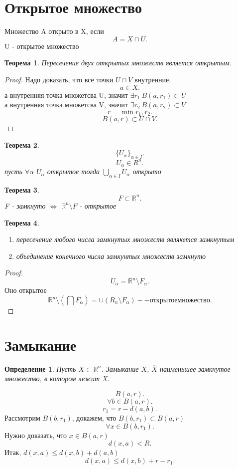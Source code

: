 \documentclass[14pt]{extarticle} \usepackage{fontspec}
\newtheorem{theorem}{Теорема}
\newtheorem{definition}{Определение}
\begin{document}
\section{Открытое множество}
Множество A открыто в  X, если
\[
	A = X \cap U
	.\]
U - открытое множество
\begin{theorem}
	Пересечение двух открытых множеств является открытым.
\end{theorem}
\begin{proof}
	Надо доказать, что все точки $U \cap V$ внутренние.\\
	\[
		a \in X
		.\]
	а внутренняя точка множетсва U, значит  $\exists r_1  ~ B(a,r_1) \subset U$\\
	а внутренняя точка множетсва V, значит  $\exists r_2  ~ B(a,r_2) \subset V$
	\[
		r = \min{r_1,r_2}
		.\]
	\[
		B(a,r) \subset U \cap V
		.\]
\end{proof}
\begin{theorem}
	\[
		\{U_{\alpha}\}_{\alpha \in I}
		.\]
	\[
		U_{\alpha} \in R^{n}
		.\]
	пусть $\forall  \alpha$ $U_{\alpha}$ открытое
	тогда $\bigcup_{\alpha \in I} U_{\alpha}$ открыто
\end{theorem}
\begin{theorem}
	\[
		F \subset \mathbb{R}^{n}
		.\]
	F - замкнуто $\iff$  $\mathbb{R}^{n} \setminus F$ - открытое
\end{theorem}
\begin{theorem}
	\begin{enumerate}
		\item пересечение любого числа замкнутых множеств являкется замкнутым
		\item объединение конечного числа замкунтых множеств замкнуто
	\end{enumerate}
\end{theorem}
\begin{proof}
	\[
		U_{\alpha} = \mathbb{R}^{n} \setminus F_{\alpha}
		.\]
	Оно открытое
	\[
		\mathbb{R}^{n} \setminus (\bigcap F_{\alpha}) =
		\cup (R_{n} \setminus F_{\alpha}) -- открытое множество
		.\]
\end{proof}
\section{Замыкание}
\begin{definition}
	Пусть $X \subset \mathbb{R}^{n}$. Замыкание $X$,  $\overline{X}$ наименьшее замкнутое множество, в котором лежит X.
\end{definition}
\[
	B(a,r)
	.\]
\[
	\forall  b \in B(a,r)
	.\]
\[
	r_1 = r - d(a,b)
	.\]
Рассмотрим $B(b,r_1)$, докажем, что $B(b,r_1) \subset B(a,r)$
\[
	\forall  x \in B(b,r_1)
	.\]
Нужно доказать, что $x \in B(a,r)$
\[
	d(x,a) < R
	.\]
Итак, $d(x,a) \le  d(x,b) + d(a,b)$
\[
	d(x,a) \le  d(x,b) + r - r_1
	.\]
\end{document}
